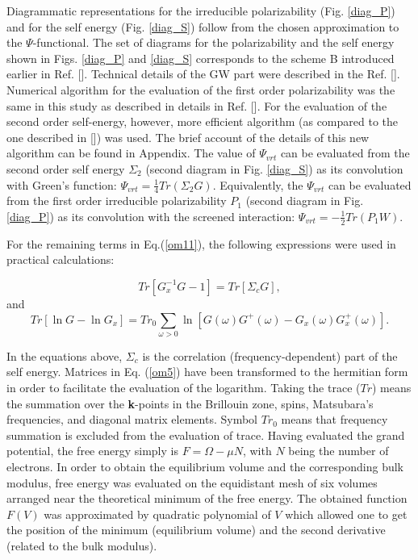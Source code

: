 \documentclass[aps,prb,floatfix,epsfig,twocolumn,preprintnumbers]{revtex4}
\begin{document}
Diagrammatic representations for the irreducible polarizability (Fig. \ref{diag_P}) and for the self energy (Fig. \ref{diag_S}) follow from the chosen approximation to the $\Psi$-functional. The set of diagrams for the polarizability and the self energy shown in Figs. \ref{diag_P} and \ref{diag_S} corresponds to the scheme B introduced earlier in Ref. []. Technical details of the GW part were described in the Ref. []. Numerical algorithm for the evaluation of the first order polarizability was the same in this study as described in details in Ref. []. For the evaluation of the second order self-energy, however, more efficient algorithm (as compared to the one described in []) was used. The brief account of the details of this new algorithm can be found in Appendix. The value of $\Psi_{vrt}$ can be evaluated from the second order self energy $\Sigma_{2}$ (second diagram in Fig. \ref{diag_S}) as its convolution with Green's function: $\Psi_{vrt}=\frac{1}{4}Tr(\Sigma_{2}G)$. Equivalently, the $\Psi_{vrt}$ can be evaluated from the first order irreducible polarizability $P_{1}$ (second diagram in Fig. \ref{diag_P}) as its convolution with the screened interaction: $\Psi_{vrt}=-\frac{1}{2}Tr(P_{1}W)$.



For the remaining terms in Eq.(\ref{om11}), the following expressions were used in practical calculations:




\begin{equation}\label{om4}
Tr[G^{-1}_{x}G-1]=Tr[\Sigma_{c}G],
\end{equation}
and
\begin{equation}\label{om5}
Tr[\ln G-\ln G_{x}]=Tr_{0} \sum_{\omega>0}\ln [G(\omega)G^{+}(\omega)-G_{x}(\omega)G^{+}_{x}(\omega)].
\end{equation}

In the equations above, $\Sigma_{c}$ is the correlation (frequency-dependent) part of the self energy. Matrices in Eq. (\ref{om5}) have been transformed to the hermitian form in order to facilitate the evaluation of the logarithm. Taking the trace ($Tr$) means the summation over the \textbf{k}-points in the Brillouin zone, spins, Matsubara's frequencies, and diagonal matrix elements. Symbol $Tr_{0}$ means that frequency summation is excluded from the evaluation of trace. Having evaluated the grand potential, the free energy simply is $F=\Omega-\mu N$, with $N$ being the number of electrons. In order to obtain the equilibrium volume and the corresponding bulk modulus, free energy was evaluated on the equidistant mesh of six volumes arranged near the theoretical minimum of the free energy. The obtained function $F(V)$ was approximated by quadratic polynomial of $V$ which allowed one to get the position of the minimum (equilibrium volume) and the second derivative (related to the bulk modulus).
\end{document}

